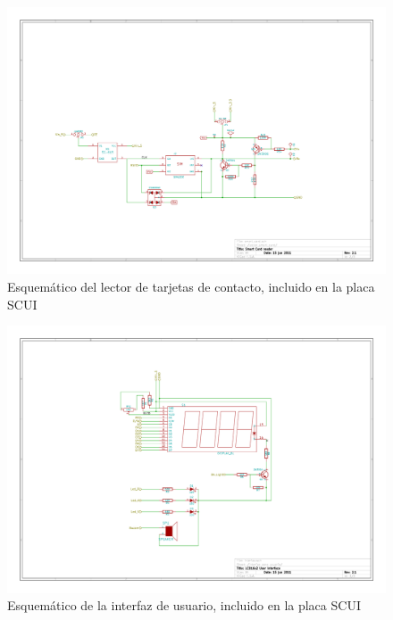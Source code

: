 \begin{figure}[H]
\centering
  \begin{center}
   \includegraphics[angle=90]{Imagenes/scui-lector_smart_card.jpg}
  \end{center}
  \caption{Esquemático del lector de tarjetas de contacto, incluido en la placa SCUI}\label{Fig:HW} 
\end{figure}
\begin{figure}[H]
\centering
  \begin{center}
   \includegraphics[angle=90]{Imagenes/scui-interfaz_para_usuario.jpg}
  \end{center}
  \caption{Esquemático de la interfaz de usuario, incluido en la placa SCUI}\label{Fig:HW} 
\end{figure}



